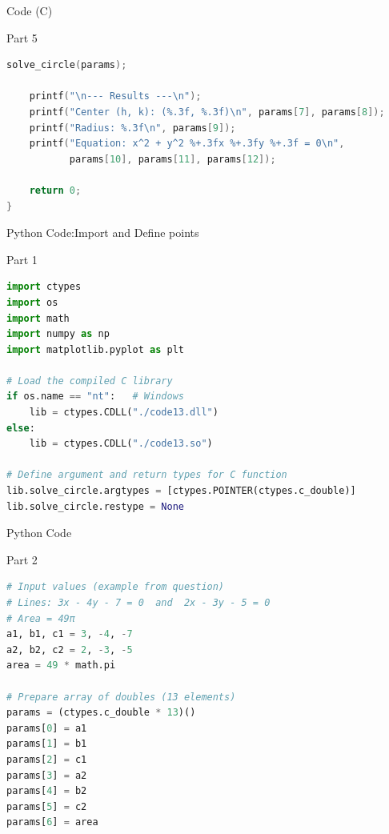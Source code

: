 \documentclass{beamer}
\begin{document}
\begin{frame}[fragile]{ Code (C)}
\begin{block}{Part 5}
\begin{lstlisting}[language=C, basicstyle=\ttfamily\small, keywordstyle=\color{blue}, frame=single]
 solve_circle(params);

    printf("\n--- Results ---\n");
    printf("Center (h, k): (%.3f, %.3f)\n", params[7], params[8]);
    printf("Radius: %.3f\n", params[9]);
    printf("Equation: x^2 + y^2 %+.3fx %+.3fy %+.3f = 0\n",
           params[10], params[11], params[12]);

    return 0;
}

\end{lstlisting}
\end{block}
\end{frame}

\begin{frame}[fragile]{Python Code:Import and Define points}
\begin{block}{Part 1}
\begin{lstlisting}[language=Python, basicstyle=\ttfamily\small, keywordstyle=\color{blue}, frame=single]
import ctypes
import os
import math
import numpy as np
import matplotlib.pyplot as plt

# Load the compiled C library
if os.name == "nt":   # Windows
    lib = ctypes.CDLL("./code13.dll")
else:
    lib = ctypes.CDLL("./code13.so")

# Define argument and return types for C function
lib.solve_circle.argtypes = [ctypes.POINTER(ctypes.c_double)]
lib.solve_circle.restype = None

\end{lstlisting}
\end{block}
\end{frame}


\begin{frame}[fragile]{Python Code}
\begin{block}{Part 2}
\begin{lstlisting}[language=Python, basicstyle=\ttfamily\small, keywordstyle=\color{blue}, frame=single]
# Input values (example from question)
# Lines: 3x - 4y - 7 = 0  and  2x - 3y - 5 = 0
# Area = 49π
a1, b1, c1 = 3, -4, -7
a2, b2, c2 = 2, -3, -5
area = 49 * math.pi

# Prepare array of doubles (13 elements)
params = (ctypes.c_double * 13)()
params[0] = a1
params[1] = b1
params[2] = c1
params[3] = a2
params[4] = b2
params[5] = c2
params[6] = area

\end{lstlisting}
\end{block}
\end{frame}
\end{document}
